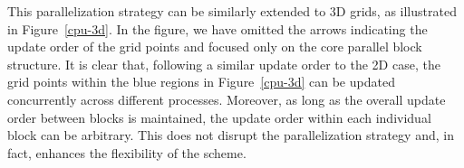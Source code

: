 \documentclass[fleqn,11pt]{elsarticle}
\numberwithin{equation}{section}
\begin{document}
This parallelization strategy can be similarly extended to 3D grids, as illustrated in Figure~\ref{cpu-3d}. In the figure, we have omitted the arrows indicating the update order of the grid points and focused only on the core parallel block structure. It is clear that, following a similar update order to the 2D case, the grid points within the blue regions in Figure~\ref{cpu-3d} can be updated concurrently across different processes. Moreover, as long as the overall update order between blocks is maintained, the update order within each individual block can be arbitrary. This does not disrupt the parallelization strategy and, in fact, enhances the flexibility of the scheme.


\begin{figure}[H]
	\centering
	\begin{minipage}{0.45\textwidth}
			\begin{tikzpicture}[scale=0.52,inner sep=0pt,minimum size=2mm,thick]


\end{tikzpicture}
\end{minipage}
\end{figure}
\end{document}
